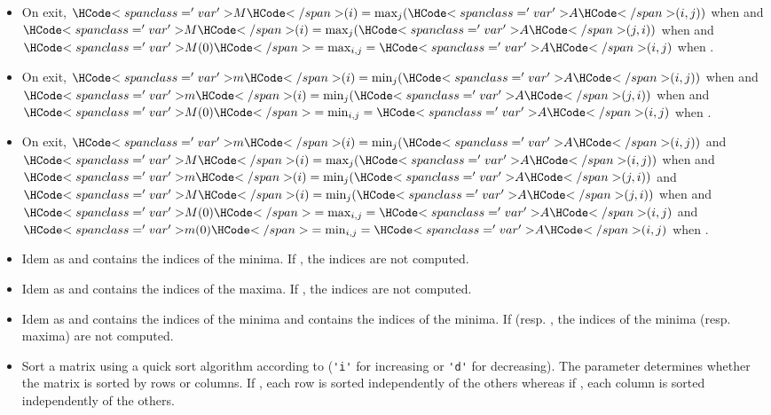\begin{itemize}
\item {}
  \sshortdescribe On exit, $\var{M}(i) = \max_{j}(\var{A}(i, j))$ when 
  and $\var{M}(i) = \max_{j}(\var{A}(j, i))$ when  and $\var{M(0)} =
  \max_{i,j} = \var{A}(i, j)$ when .

\item {}
  \sshortdescribe On exit, $\var{m}(i) = \min_{j}(\var{A}(i, j))$ when 
  and $\var{m}(i) = \min_{j}(\var{A}(j, i))$ when  and $\var{M(0)} =
  \min_{i,j} = \var{A}(i, j)$ when .

\item {}
  \sshortdescribe On exit, $\var{m}(i) = \min_{j}(\var{A}(i, j))$ and $\var{M}(i) =
  \max_{j}(\var{A}(i, j))$ when  and $\var{m}(i) = \min_{j}(\var{A}(j, i))$
  and $\var{M}(i) = \min_{j}(\var{A}(j, i))$ when  and $\var{M(0)} =
  \max_{i,j} = \var{A}(i, j)$ and  $\var{m(0)} =\min_{i,j} = \var{A}(i, j)$ when .
  
\item {}
  \sshortdescribe Idem as  and  contains the
  indices of the minima. If , the indices are not computed.

\item {}
  \sshortdescribe Idem as  and  contains the
  indices of the maxima. If , the indices are not computed.

\item {}
  \sshortdescribe Idem as  and  contains the
  indices of the minima and  contains the indices of the minima. If
   (resp. , the indices of the minima
  (resp. maxima) are not computed.

\item {}
  \sshortdescribe Sort a matrix using a quick sort algorithm according to
   (\verb!'i'! for increasing or \verb!'d'! for decreasing). The parameter  determines
  whether the matrix is sorted by rows or columns. If , each row
  is sorted independently of the others whereas if , each column
  is sorted independently of the others.


\end{itemize}
